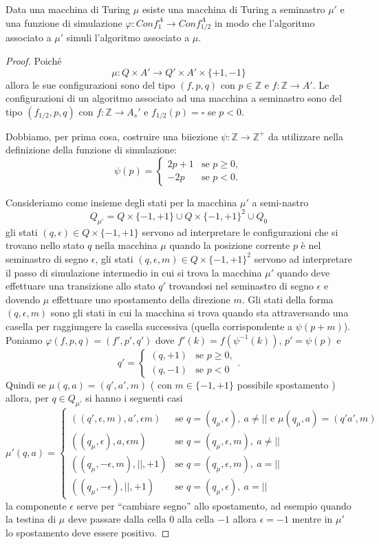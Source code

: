 \begin{prop}\label{prop:nastro-seminastro}
Data una macchina di Turing $\mu$ esiste una macchina di Turing a seminastro $\mu'$ e una funzione di simulazione $\varphi : Conf_1^A \to Conf_{1/2}^A$ in modo che l'algoritmo associato a $\mu'$ simuli l'algoritmo associato a $\mu$.

\begin{proof}
Poiché
\[
\mu : Q\times A' \to Q'\times A'\times\{+1,-1\}
\]
allora le sue configurazioni sono del tipo $(f,p,q)$ con $p\in\mathbb{Z}$ e $f:\mathbb{Z}\to A'$. Le configurazioni di un algoritmo associato ad una macchina a seminastro sono del tipo $(f_{1/2},p,q)$ con $f:\mathbb{Z}\to A_s'$ e $f_{1/2}(p)=\square$ se $p<0$.

Dobbiamo, per prima cosa, costruire una biiezione $\psi:\mathbb{Z}\to\mathbb{Z}^+$ da utilizzare nella definizione della funzione di simulazione:
\[
\psi(p)=\begin{cases}
2p+1 & \text{se } p\geq 0,\\
-2p & \text{se } p<0.
\end{cases}
\]

Consideriamo come insieme degli stati per la macchina $\mu'$ a semi-nastro
\[
Q_{\mu'}=Q\times\{-1,+1\}\cup Q\times\{-1,+1\}^2\cup Q_0
\]
gli stati $(q,\epsilon)\in Q\times\{-1,+1\}$ servono ad interpretare le configurazioni che si trovano nello stato $q$ nella macchina $\mu$ quando la posizione corrente $p$ è nel seminastro di segno $\epsilon$, gli stati $(q,\epsilon,m)\in Q\times\{-1,+1\}^2$ servono ad interpretare il passo di simulazione intermedio in cui si trova la macchina $\mu'$ quando deve effettuare una transizione allo stato $q'$ trovandosi nel seminastro di segno $\epsilon$ e dovendo $\mu$ effettuare uno spostamento della direzione $m$.
Gli stati della forma $(q,\epsilon,m)$ sono gli stati in cui la macchina si trova quando sta attraversando una casella per raggiungere la casella successiva (quella corrispondente a $\psi(p+m)$).
Poniamo $\varphi(f,p,q)=(f',p',q')$ dove $f'(k)=f(\psi^{-1}(k))$, $p'=\psi(p)$ e
\[
q'=\begin{cases}
(q,+1) & \text{se } p\geq 0,\\
(q,-1) & \text{se } p<0
\end{cases}.
\]
Quindi se $\mu(q,a)=(q',a',m)$ ( con $m\in\{-1,+1\}$ possibile spostamento ) allora, per $q\in Q_{\mu'}$ si hanno i seguenti casi
\[
\mu'(q,a)=\begin{cases}
((q',\epsilon,m),a',\epsilon m) & \text{se } q=(q_\mu,\epsilon),\ a\neq|| \text{ e } \mu(q_\mu,a)=(q'a',m)\\
((q_\mu,\epsilon),a,\epsilon m) & \text{se } q=(q_\mu,\epsilon,m),\ a\neq||\\
((q_\mu,-\epsilon,m),||,+1) & \text{se } q=(q_\mu,\epsilon,m),\ a=||\\
((q_\mu,-\epsilon),||,+1) & \text{se } q=(q_\mu,\epsilon),\ a=||
\end{cases}
\]
la componente $\epsilon$ serve per ``cambiare segno'' allo spostamento, ad esempio quando la testina di $\mu$ deve passare dalla cella $0$ alla cella $-1$ allora $\epsilon=-1$ mentre in $\mu'$ lo spostamento deve essere positivo.


\end{proof}
\end{prop}
